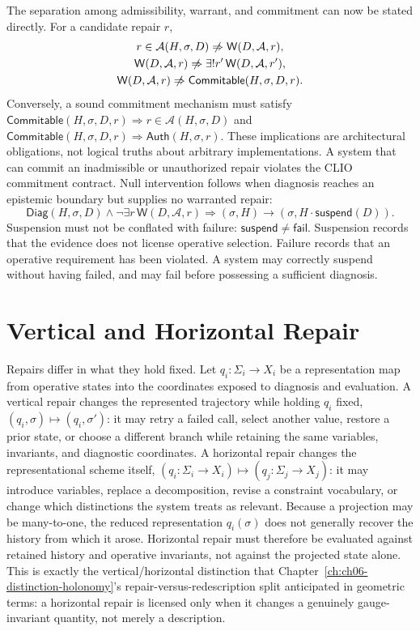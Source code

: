 The separation among admissibility, warrant, and commitment can now be stated directly. For a candidate repair $r$,
\[
\begin{gathered}
r \in \mathcal{A}(H,\sigma,D) \centernot\Rightarrow \mathsf{W}(D,\mathcal{A},r), \\
\mathsf{W}(D,\mathcal{A},r) \centernot\Rightarrow \exists! r'\, \mathsf{W}(D,\mathcal{A},r'), \\
\mathsf{W}(D,\mathcal{A},r) \centernot\Rightarrow \mathsf{Commitable}(H,\sigma,D,r).
\end{gathered}
\]
Conversely, a sound commitment mechanism must satisfy $\mathsf{Commitable}(H,\sigma,D,r) \Rightarrow r \in \mathcal{A}(H,\sigma,D)$ and $\mathsf{Commitable}(H,\sigma,D,r) \Rightarrow \mathsf{Auth}(H,\sigma,r)$. These implications are architectural obligations, not logical truths about arbitrary implementations. A system that can commit an inadmissible or unauthorized repair violates the CLIO commitment contract. Null intervention follows when diagnosis reaches an epistemic boundary but supplies no warranted repair:
\[
\mathsf{Diag}(H,\sigma,D) \land \neg\exists r\, \mathsf{W}(D,\mathcal{A},r) \Longrightarrow (\sigma,H) \longrightarrow (\sigma, H \cdot \mathsf{suspend}(D)).
\]
Suspension must not be conflated with failure: $\mathsf{suspend} \neq \mathsf{fail}$. Suspension records that the evidence does not license operative selection. Failure records that an operative requirement has been violated. A system may correctly suspend without having failed, and may fail before possessing a sufficient diagnosis.

\section{Vertical and Horizontal Repair}

Repairs differ in what they hold fixed. Let $q_i : \Sigma_i \to X_i$ be a representation map from operative states into the coordinates exposed to diagnosis and evaluation. A vertical repair changes the represented trajectory while holding $q_i$ fixed, $(q_i,\sigma) \mapsto (q_i,\sigma')$: it may retry a failed call, select another value, restore a prior state, or choose a different branch while retaining the same variables, invariants, and diagnostic coordinates. A horizontal repair changes the representational scheme itself, $(q_i : \Sigma_i \to X_i) \mapsto (q_j : \Sigma_j \to X_j)$: it may introduce variables, replace a decomposition, revise a constraint vocabulary, or change which distinctions the system treats as relevant. Because a projection may be many-to-one, the reduced representation $q_i(\sigma)$ does not generally recover the history from which it arose. Horizontal repair must therefore be evaluated against retained history and operative invariants, not against the projected state alone. This is exactly the vertical/horizontal distinction that Chapter~\ref{ch:ch06-distinction-holonomy}'s repair-versus-redescription split anticipated in geometric terms: a horizontal repair is licensed only when it changes a genuinely gauge-invariant quantity, not merely a description.

